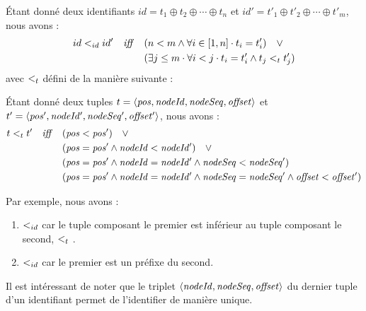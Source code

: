 \begin{definition}
  Étant donné deux identifiants $id = t_1 \oplus t_2 \oplus \cdots \oplus t_n$ et $id' = t'_1 \oplus t'_2 \oplus \cdots \oplus t'_m$, nous avons :
  \begin{equation*}
    \begin{split}
      id <_{id} id' \quad \mathit{iff} \quad     & (n < m \land \forall i \in [1,n] \cdot t_i = t'_i) \quad \lor \\
                                            & (\exists j \leq m \cdot \forall i < j \cdot t_i = t'_i \land t_j <_{t} t'_j) \\
    \end{split}
  \end{equation*}
  avec $<_{t}$ défini de la manière suivante :
  \begin{subdefinition}
    Étant donné deux tuples $t = \langle \mathit{pos},\mathit{nodeId},\mathit{nodeSeq},\mathit{offset} \rangle$ et $t' = \langle \mathit{pos'},\mathit{nodeId'},\mathit{nodeSeq'},\mathit{offset'} \rangle$, nous avons :
    \begin{equation*}
      \begin{split}
        t <_{t} t' \quad \mathit{iff} \quad  & (\mathit{pos} < \mathit{pos}') \quad \lor \\
                                            & (\mathit{pos} = \mathit{pos'} \land \mathit{nodeId} < \mathit{nodeId'}) \quad \lor \\
                                            & (\mathit{pos} = \mathit{pos'} \land \mathit{nodeId} = \mathit{nodeId'} \land \mathit{nodeSeq} < \mathit{nodeSeq'}) \\
                                            & (\mathit{pos} = \mathit{pos'} \land \mathit{nodeId} = \mathit{nodeId'} \land \mathit{nodeSeq} = \mathit{nodeSeq'} \land \mathit{offset} < \mathit{offset'}) \\
      \end{split}
    \end{equation*}
  \end{subdefinition}
\end{definition}

Par exemple, nous avons :
\begin{enumerate}
  \item  {} $<_{id}$  car le tuple composant le premier est inférieur au tuple composant le second, \ie {} $<_{t}$ .
  \item {} $<_{id}$  car le premier est un préfixe du second.
\end{enumerate}

Il est intéressant de noter que le triplet $\langle \mathit{nodeId},\mathit{nodeSeq},\mathit{offset} \rangle$ du dernier tuple d'un identifiant permet de l'identifier de manière unique.

